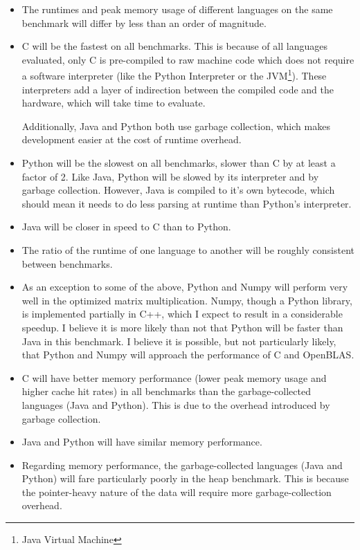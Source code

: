 \documentclass[12pt,letterpaper]{article}
\begin{document}
\begin{itemize}
	\item The runtimes and peak memory usage of different languages
		on the same benchmark will differ by less than an order of magnitude.

	\item C will be the fastest on all benchmarks. This is because of all
		languages evaluated, only C is pre-compiled to raw machine code which does
		not require a software interpreter (like the Python Interpreter or the
		JVM\footnote{Java Virtual Machine}). These interpreters add a layer of
		indirection between the compiled code and the hardware, which will take
		time to evaluate.

		Additionally, Java and Python both use garbage collection, which makes
		development easier at the cost of runtime overhead.

	\item Python will be the slowest on all benchmarks, slower than C by at least
		a factor of 2. Like Java, Python will be
		slowed by its interpreter and by garbage collection. However, Java is
		compiled to it's own bytecode, which should mean it needs to do less parsing
		at runtime than Python's interpreter.

	\item Java will be closer in speed to C than to Python.

	\item The ratio of the runtime of one language to another will be roughly
		consistent between benchmarks.

	\item As an exception to some of the above, Python and Numpy will perform very
		well in the optimized matrix multiplication. Numpy, though a Python library, is
		implemented partially in C++, which I expect to result in a considerable speedup. I
		believe it is more likely than not that Python will be faster than Java in
		this benchmark. I believe it is possible, but not particularly likely, that
		Python and Numpy will approach the performance of C and OpenBLAS.

	\item C will have better memory performance (lower peak memory usage and
		higher cache hit rates) in all
		benchmarks than the garbage-collected languages (Java and Python). This is
		due to the overhead introduced by garbage collection.

	\item Java and Python will have similar memory performance.

	\item Regarding memory performance, the garbage-collected languages (Java and
		Python) will fare particularly poorly in the heap benchmark. This is because
		the pointer-heavy nature of the data will require more garbage-collection
		overhead.

\end{itemize}
\end{document}
